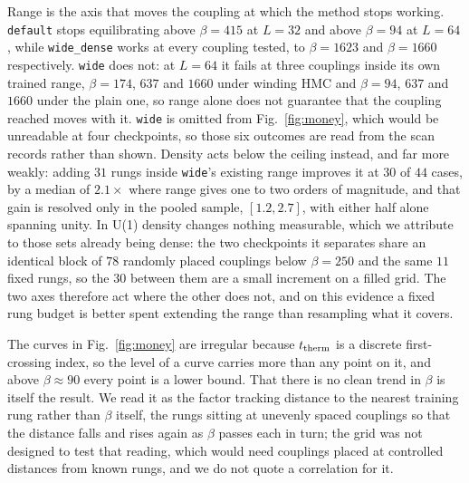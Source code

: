 \documentclass[prd, twocolumn, superscriptaddress, nofootinbib,floatfix]{revtex4-2}
\DeclareRobustCommand{\fig}[1]{Fig.~\ref{fig:#1}}
\begin{document}
Range is the axis that moves the coupling at which the method stops working.
\texttt{default} stops equilibrating
above $\beta=415$ at $L=32$ and above $\beta=94$ at $L=64$, while
\texttt{wide\_dense} works at every coupling tested, to $\beta=1623$ and
$\beta=1660$ respectively. \texttt{wide} does not: at $L=64$ it fails at three couplings inside its own
trained range, $\beta=174$, $637$ and $1660$ under winding HMC and
$\beta=94$, $637$ and $1660$ under the plain one, so range alone does not
guarantee that the coupling reached moves with it. \texttt{wide} is omitted from
\fig{money}, which would be unreadable at four checkpoints, so those six
outcomes are read from the scan records rather than shown.
Density acts below the ceiling instead, and far more weakly: adding $31$ rungs
inside \texttt{wide}'s existing range improves it at $30$ of $44$ cases, by a
median of $2.1\times$ where range gives one to two orders of magnitude, and that
gain is resolved only in the pooled sample, $[1.2,2.7]$, with either half alone
spanning unity. In U(1) density changes nothing measurable, which we attribute
to those sets already being dense: the two checkpoints it separates share an
identical block of $78$ randomly placed couplings below $\beta=250$ and the same
$11$ fixed rungs, so the $30$ between them are a small increment on a filled
grid. The two
axes therefore act where the other does not, and on this evidence a fixed rung
budget is better spent extending the range than resampling what it covers.

The curves in \fig{money} are irregular because $t_{\rm therm}$ is a discrete
first-crossing index, so the level of a curve carries more than any point on it,
and above $\beta\approx90$ every point is a lower bound. That there is no clean
trend in $\beta$ is itself the result. We read it as the factor tracking
distance to the nearest training rung rather than $\beta$ itself, the rungs
sitting at unevenly spaced couplings so that the distance falls and rises again
as $\beta$ passes each in turn; the grid was not designed to test that reading,
which would need couplings placed at controlled distances from known rungs, and
we do not quote a correlation for it.
\end{document}
